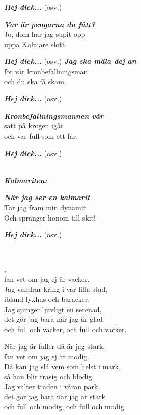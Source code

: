 {{\textbf{\textit{Hej dick...}} (osv.)

\leftrepeat \textbf{\textit{Var är pengarna du fått?}}\\
Jo, dom har jag supit opp \rightrepeat\\
uppå Kalmare slott.

\textbf{\textit{Hej dick...}} (osv.)
\newpage
\leftrepeat \textbf{\textit{Jag ska mäla dej an}}\\
för vår kronbefallningsman \rightrepeat\\
och du ska få skam.

\textbf{\textit{Hej dick...}} (osv.)

\leftrepeat \textbf{\textit{Kronbefallningsmannen vår}}\\
satt på krogen igår \rightrepeat\\
och var full som ett får.

\textbf{\textit{Hej dick...}} (osv.)

\vspace{0.5cm} \\
\songtext{}\textbf{\textit{{Kalmariten: }}}

\leftrepeat \textbf{\textit{När jag ser en kalmarit}}\\
Tar jag fram min dynamit \rightrepeat\\
Och spränger honom till skit!

\textbf{\textit{Hej dick...}} (osv.)



\newpage

 \\       

,\\
fan vet om jag ej är vacker.\\
Jag vandrar kring i vår lilla stad,\\
ibland lyxhus och baracker.\\
Jag sjunger ljuvligt en serenad,\\
det gör jag bara när jag är glad\\
och full och vacker, och full och vacker.

När jag är fuller då är jag stark,\\
fan vet om jag ej är modig.\\
Då kan jag slå vem som helst i mark,\\
så han blir trasig och blodig.\\
Jag välter träden i våran park,\\
det gör jag bara när jag är stark\\
och full och modig, och full och modig.

}}
